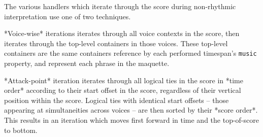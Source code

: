 The various handlers which iterate through the score during non-rhythmic
interpretation use one of two techniques.

*Voice-wise* iterations iterates through all voice contexts in the score, then
iterates through the top-level containers in those voices. These top-level
containers are the same containers reference by each performed timespan's
\texttt{music} property, and represent each phrase in the maquette.

*Attack-point* iteration iterates through all logical ties in the score in
*time order* according to their start offset in the score, regardless of their
vertical position within the score. Logical ties with identical start offsets
-- those appearing at simultaneities across voices -- are then sorted by their
*score order*. This results in an iteration which moves first forward in time
and the top-of-score to bottom.

\begin{comment}
<abjad>[stylesheet=../consort.ily]
music_specifier = consort.MusicSpecifier(
    attachment_handler=consort.AttachmentHandler(),
    rhythm_maker=rhythmmakertools.TaleaRhythmMaker(
        extra_counts_per_division=(0, 1),
        talea=rhythmmakertools.Talea([2, 3, 2, 4], 16),
        ),
    )
timespan_maker = consort.TaleaTimespanMaker(
    initial_silence_talea=rhythmmakertools.Talea([0, 1], 4),
    playing_groupings=(1, 2, 2, 1, 2),
    playing_talea=rhythmmakertools.Talea([2, 3], 8),
    silence_talea=rhythmmakertools.Talea([1, 2, 3, 4], 8),
    )
music_setting = consort.MusicSetting(
    timespan_maker=timespan_maker,
    v1=music_specifier,
    v2=music_specifier,
    )
segment_maker = consort.SegmentMaker(
    desired_duration_in_seconds=8,
    discard_final_silence=True,
    permitted_time_signatures=[(2, 4), (5, 16), (3, 4)],
    score_template=templatetools.GroupedRhythmicStavesScoreTemplate(
        staff_count=2,
        with_clefs=True,
        ),
    settings=[music_setting],
    tempo=indicatortools.Tempo((1, 4), 72),
    )
illustration = segment_maker(annotate=True, verbose=False)
show(illustration)
</abjad>
\end{comment}

